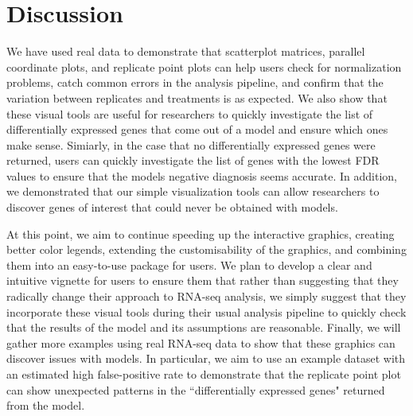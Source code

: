 \documentclass[useAMS,referee]{biom}
\begin{document}
\pagebreak

\section{Discussion}
\label{s:discuss}

We have used real data to demonstrate that scatterplot matrices, parallel coordinate plots, and replicate point plots can help users check for normalization problems, catch common errors in the analysis pipeline, and confirm that the variation between replicates and treatments is as expected. We also show that these visual tools are useful for researchers to quickly investigate the list of differentially expressed genes that come out of a model and ensure which ones make sense. Simiarly, in the case that no differentially expressed genes were returned, users can quickly investigate the list of genes with the lowest FDR values to ensure that the models negative diagnosis seems accurate. In addition, we demonstrated that our simple visualization tools can allow researchers to discover genes of interest that could never be obtained with models.

At this point, we aim to continue speeding up the interactive graphics, creating better color legends, extending the customisability of the graphics, and combining them into an easy-to-use package for users. We plan to develop a clear and intuitive vignette for users to ensure them that rather than suggesting that they radically change their approach to RNA-seq analysis, we simply suggest that they incorporate these visual tools during their usual analysis pipeline to quickly check that the results of the model and its assumptions are reasonable. Finally, we will gather more examples using real RNA-seq data to show that these graphics can discover issues with models. In particular, we aim to use an example dataset with an estimated high false-positive rate to demonstrate that the replicate point plot can show unexpected patterns in the ``differentially expressed genes" returned from the model.



\backmatter

\end{document}
